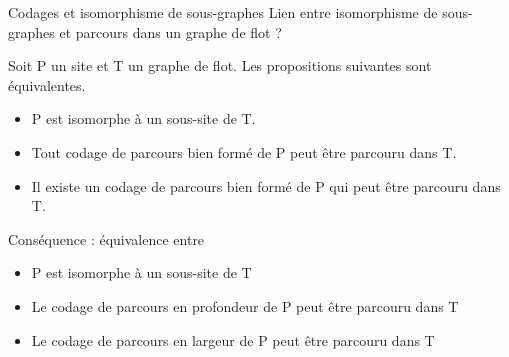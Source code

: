 \documentclass{beamer}
\begin{document}
\begin{frame}{Codages et isomorphisme de sous-graphes}
Lien entre isomorphisme de sous-graphes et parcours dans un graphe de flot ?

\pause
\begin{theo}
 Soit P un site et T un graphe de flot. Les propositions suivantes sont équivalentes.
 \begin{itemize}
  \item P est isomorphe à un sous-site de T.
  \item Tout codage de parcours bien formé de P peut être parcouru dans T.
  \item Il existe un codage de parcours bien formé de P qui peut être parcouru dans T.
 \end{itemize}
\end{theo}

\pause
Conséquence : équivalence entre
\begin{itemize}
 \item P est isomorphe à un sous-site de T
 \item Le codage de parcours en profondeur de P peut être parcouru dans T
 \item Le codage de parcours en largeur de P peut être parcouru dans T
\end{itemize}

\end{frame}
\end{document}
